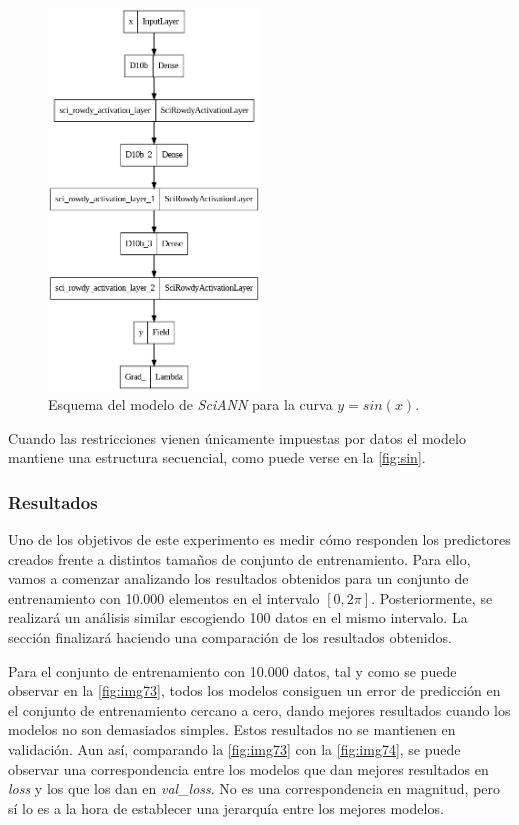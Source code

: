  \begin{figure}[htbp]
    \centering
    \includegraphics[width=0.5\textwidth]{img/sin.png}
    \caption{Esquema del modelo de \textit{SciANN} para la curva $y=sin(x)$.}
    \label{fig:sin}
\end{figure}


Cuando las restricciones vienen únicamente impuestas por datos el modelo mantiene una estructura secuencial, como puede verse en la \autoref{fig:sin}. 


\subsubsection{Resultados}

Uno de los objetivos de este experimento es medir cómo responden los predictores creados frente a distintos tamaños de conjunto de entrenamiento. Para ello, vamos a comenzar analizando los resultados obtenidos para un conjunto de entrenamiento con 10.000 elementos en el intervalo $[0,2\pi]$. Posteriormente, se realizará un análisis similar escogiendo 100 datos en el mismo intervalo. La sección finalizará haciendo una comparación de los resultados obtenidos. 

Para el conjunto de entrenamiento con 10.000 datos, tal y como se puede observar en la \autoref{fig:img73}, todos los modelos consiguen un error de predicción en el conjunto de entrenamiento cercano a cero, dando mejores resultados cuando los modelos no son demasiados simples. Estos resultados no se mantienen en validación. Aun así, comparando la \autoref{fig:img73} con la \autoref{fig:img74}, se puede observar una correspondencia entre los modelos que dan mejores resultados en \textit{loss} y los que los dan en \textit{val\_loss}. No es una correspondencia en magnitud, pero sí lo es a la hora de establecer una jerarquía entre los mejores modelos. 



